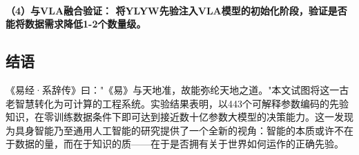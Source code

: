 \documentclass[12pt,a4paper]{article}
\begin{document}
\paragraph{（4）与VLA融合验证： 将YLYW先验注入VLA模型的初始化阶段，验证是否能将数据需求降低1-2个数量级。}

\subsection{结语}
《易经·系辞传》曰："《易》与天地准，故能弥纶天地之道。"本文试图将这一古老智慧转化为可计算的工程系统。实验结果表明，以443个可解释参数编码的先验知识，在零训练数据条件下即可达到接近数十亿参数大模型的决策能力。这一发现为具身智能乃至通用人工智能的研究提供了一个全新的视角：智能的本质或许不在于数据的量，而在于知识的质——在于是否拥有关于世界如何运作的正确先验。
\end{document}
